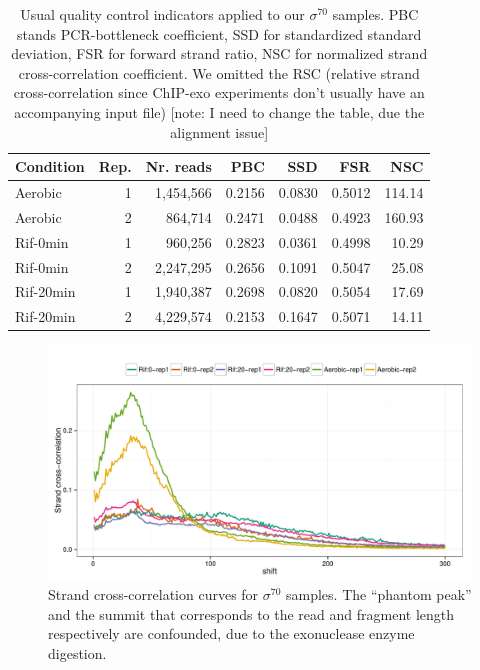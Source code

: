 \documentclass{bmcart}\usepackage[]{graphicx}\usepackage[]{color}
\begin{document}
\begin{table}[h]
  \centering
\begin{tabular}{l|r|r|r|r|r|r}
\hline\hline
Condition & Rep. & Nr. reads & PBC & SSD & FSR & NSC  \\
\hline\hline
Aerobic & 1 & 1,454,566 & 0.2156 & 0.0830 & 0.5012 & 114.14 \\
\hline
Aerobic & 2 & 864,714 & 0.2471 & 0.0488 & 0.4923 & 160.93  \\
\hline
Rif-0min & 1 & 960,256 & 0.2823 & 0.0361 & 0.4998 & 10.29 \\
\hline
Rif-0min & 2 & 2,247,295 & 0.2656 & 0.1091 & 0.5047 &  25.08  \\
\hline
Rif-20min & 1 & 1,940,387 & 0.2698 & 0.0820 & 0.5054 & 17.69  \\
\hline
Rif-20min & 2 & 4,229,574 & 0.2153 & 0.1647 & 0.5071 &  14.11 \\
\hline
\end{tabular}  
\caption{Usual quality control indicators applied to our
  $\sigma^{70}$ samples. PBC stands PCR-bottleneck coefficient, SSD
  for standardized standard deviation, FSR for forward strand ratio,
  NSC for normalized strand cross-correlation coefficient. We
  omitted the RSC (relative strand cross-correlation since ChIP-exo
  experiments don't usually have an accompanying input file) 
  [note: I need to change the table, due the alignment issue]}

  \label{tab:qcbase}
\end{table}

\begin{figure}[h!]
  \centering
  \includegraphics[width = .8\textwidth]{../figs/for_paper/EColi_strand_cross_corr.pdf}
  \caption{Strand cross-correlation curves for $\sigma^{70}$
    samples. The ``phantom peak'' and the summit that corresponds to
    the read and fragment length respectively are confounded, due to
    the exonuclease enzyme digestion.}
  \label{figsup:scc}
\end{figure}
\end{document}
